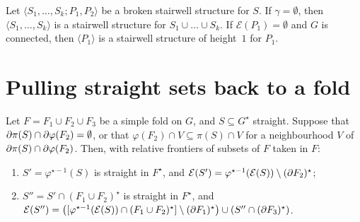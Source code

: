 
\begin{proposition}[remarks on p.~201]\label{prop:rem17}
Let $\langle S_1,\dots,S_k;P_1,P_2\rangle$ be a broken stairwell structure for $S$. If $\gamma=\emptyset$, then $\langle S_1,\dots,S_k\rangle$ is a stairwell structure for $S_1\cup\dots\cup S_k$. If
$\mathcal E(P_1)=\emptyset$ and $G$ is connected, then $\langle P_1\rangle$ is a stairwell structure of height~$1$ for $P_1$.
\end{proposition}


\section{Pulling straight sets back to a fold}

\begin{lemma}\label{lem:ho18}
Let $F=F_1\cup F_2\cup F_3$ be a simple fold on $G$, and $S\subseteq G^\star$ straight. Suppose that $\partial\pi(S)\cap\partial\varphi(F_2)=\emptyset$, or that $\varphi(F_2)\cap V\subseteq\pi(S)\cap V$ for a
neighbourhood $V$ of $\partial\pi(S)\cap\partial\varphi(F_2)$. Then, with relative frontiers of subsets of $F$ taken in $F$:
\begin{enumerate}[label=(\arabic*)]
\item $S'=\varphi^{\star-1}(S)$ is straight in $F^\star$, and $\mathcal E(S')=\varphi^{\star-1}(\mathcal E(S))\setminus(\partial F_2)^\star$;
\item $S''=S'\cap(F_1\cup F_2)^\star$ is straight in $F^\star$, and $\mathcal E(S'')=\bigl([\varphi^{\star-1}(\mathcal E(S))\cap(F_1\cup F_2)^\star]\setminus(\partial F_1)^\star\bigr)\cup(S''\cap(\partial F_3)^\star)$.
\end{enumerate}
\end{lemma}

